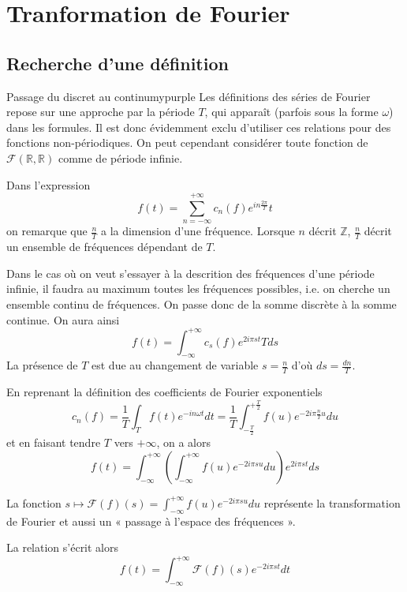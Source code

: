 \newpage

\section{Tranformation de Fourier}

\subsection{Recherche d’une définition}

    \begin{omed}{Passage du discret au continu}{mypurple}
    Les définitions des séries de Fourier repose sur une approche par la période $T$, qui apparaît (parfois sous la forme $\omega$) dans les formules. Il est donc évidemment exclu d’utiliser ces relations pour des fonctions non-périodiques. On peut cependant considérer toute fonction de $\mathcal{F}(\mathbb{R},\mathbb{R})$ comme de période infinie.

    Dans l’expression 
    \[ f(t) = \sum\limits_{n=-\infty}^{+\infty} c_n(f) e^{in\frac{2\pi}{T}}t \]
    on remarque que $\frac{n}{T}$ a la dimension d’une fréquence. Lorsque $n$ décrit $\mathbb{Z}$, $\frac{n}{T}$ décrit un ensemble de fréquences dépendant de $T$. 

    Dans le cas où on veut s’essayer à la descrition des fréquences d’une période infinie, il faudra au maximum toutes les fréquences possibles, i.e. on cherche un ensemble continu de fréquences. On passe donc de la somme discrète à la somme continue. On aura ainsi
    \[ f(t) = \int_{-\infty}^{+\infty} c_s(f) e^{2i\pi st}T ds \]
    La présence de $T$ est due au changement de variable $s = \frac{n}{T}$ d’où $ds = \frac{dn}{T}$.

    En reprenant la définition des coefficients de Fourier exponentiels
    \[ c_n(f) = \frac{1}{T}\int_{T} f(t)e^{-i n \omega t}dt = \frac{1}{T} \int_{-\frac{T}{2}}^{+\frac{T}{2}} f(u) e^{-2i\pi \frac{n}{T} u} du \]
    et en faisant tendre $T$ vers $+ \infty$, on a alors 
    \[ f(t) = \int_{-\infty}^{+\infty} \left(\int_{-\infty}^{+\infty} f(u)e^{-2i\pi s u} du \right) e^{2i\pi st}ds \]

    La fonction $s \longmapsto \mathcal{F}(f)(s) = \int_{-\infty}^{+\infty} f(u) e^{-2i\pi s u} du$ représente la transformation de Fourier et aussi un « passage à l’espace des fréquences ».

    La relation s’écrit alors 
    \[ f(t) = \int_{-\infty}^{+\infty} \mathcal{F}(f)(s) e^{-2i\pi s t}dt \]
    \end{omed}
    
